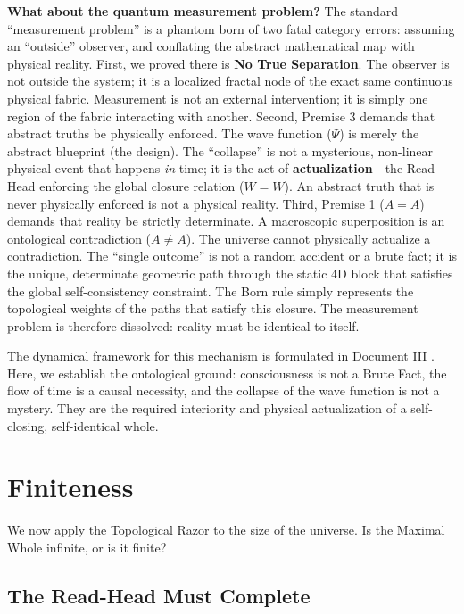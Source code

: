 \documentclass[11pt]{article}
\theoremstyle{canonstyle}
\begin{document}
\begin{realization}
\textbf{What about the quantum measurement problem?}
The standard ``measurement problem'' is a phantom born of two fatal category errors: assuming an ``outside'' observer, and conflating the abstract mathematical map with physical reality. 
First, we proved there is \textbf{No True Separation}. The observer is not outside the system; it is a localized fractal node of the exact same continuous physical fabric. Measurement is not an external intervention; it is simply one region of the fabric interacting with another. 
Second, Premise 3 demands that abstract truths be physically enforced. The wave function ($\Psi$) is merely the abstract blueprint (the design). The ``collapse'' is not a mysterious, non-linear physical event that happens \emph{in} time; it is the act of \textbf{actualization}---the Read-Head enforcing the global closure relation ($W=W$). An abstract truth that is never physically enforced is not a physical reality.
Third, Premise 1 ($A=A$) demands that reality be strictly determinate. A macroscopic superposition is an ontological contradiction ($A \neq A$). The universe cannot physically actualize a contradiction. The ``single outcome'' is not a random accident or a brute fact; it is the unique, determinate geometric path through the static 4D block that satisfies the global self-consistency constraint. The Born rule simply represents the topological weights of the paths that satisfy this closure. The measurement problem is therefore dissolved: reality must be identical to itself.

\medskip

The dynamical framework for this mechanism is formulated in Document III \cite{CanonHow}. Here, we establish the ontological ground: consciousness is not a Brute Fact, the flow of time is a causal necessity, and the collapse of the wave function is not a mystery. They are the required interiority and physical actualization of a self-closing, self-identical whole.
\end{realization}

\newpage

\section{Finiteness}

We now apply the Topological Razor to the size of the universe. Is the Maximal Whole infinite, or is it finite? 

\subsection{The Read-Head Must Complete}
\end{document}
